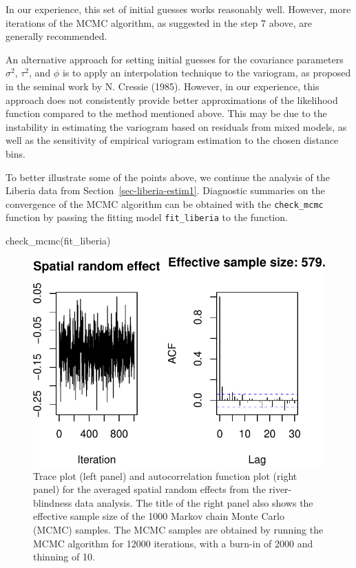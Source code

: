 \documentclass[
  letterpaper,
]{krantz}
\newenvironment{Shaded}{\begin{snugshade}}{\end{snugshade}}
\newcommand{\FunctionTok}[1]{\textcolor[rgb]{0.28,0.35,0.67}{#1}}
\newcommand{\NormalTok}[1]{\textcolor[rgb]{0.00,0.23,0.31}{#1}}
\begin{document}
In our experience, this set of initial guesses works reasonably well.
However, more iterations of the MCMC algorithm, as suggested in the step
7 above, are generally recommended.

An alternative approach for setting initial guesses for the covariance
parameters \(\sigma^2\), \(\tau^2\), and \(\phi\) is to apply an
interpolation technique to the variogram, as proposed in the seminal
work by N. Cressie (1985). However, in our experience, this approach
does not consistently provide better approximations of the likelihood
function compared to the method mentioned above. This may be due to the
instability in estimating the variogram based on residuals from mixed
models, as well as the sensitivity of empirical variogram estimation to
the chosen distance bins.

To better illustrate some of the points above, we continue the analysis
of the Liberia data from Section~\ref{sec-liberia-estim1}. Diagnostic
summaries on the convergence of the MCMC algorithm can be obtained with
the \texttt{check\_mcmc} function by passing the fitting model
\texttt{fit\_liberia} to the function.

\begin{Shaded}
\begin{Highlighting}[]
\FunctionTok{check\_mcmc}\NormalTok{(fit\_liberia)}
\end{Highlighting}
\end{Shaded}

\begin{figure}[H]

{\centering \includegraphics{03_model-fitting_files/figure-pdf/fig-check-mcmc-mean-1.pdf}

}

\caption{\label{fig-check-mcmc-mean}Trace plot (left panel) and
autocorrelation function plot (right panel) for the averaged spatial
random effects from the river-blindness data analysis. The title of the
right panel also shows the effective sample size of the 1000 Markov
chain Monte Carlo (MCMC) samples. The MCMC samples are obtained by
running the MCMC algorithm for 12000 iterations, with a burn-in of 2000
and thinning of 10.}

\end{figure}
\end{document}
